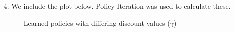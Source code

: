 \documentclass[submit]{harvardml}
\begin{document}
\begin{itemize}
    \item[4.]
    We include the plot below. Policy Iteration was used to calculate these.
    \begin{figure}[H]
        \centering
        {
        }\hfill
        {
        }\caption{Learned policies with differing discount values ($\gamma$)}
    \end{figure}
    

\end{itemize}
\end{document}
